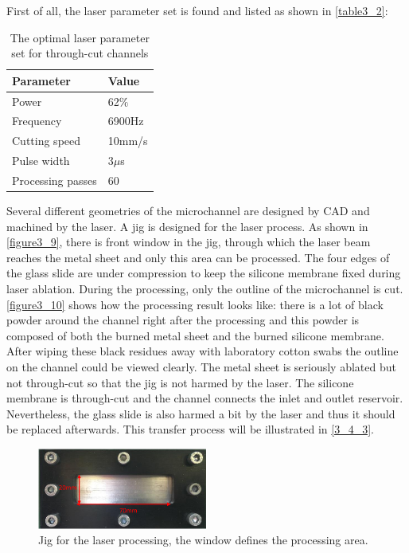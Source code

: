 First of all, the laser parameter set is found and listed as shown in \autoref{table3_2}:

\begin{table}[!h]
    \centering
    \caption{The optimal laser parameter set for through-cut channels}
    \begin{tabular}{ll}
    \toprule
    Parameter  &   Value \\
    \midrule
    Power  &  62$\%$ \\
    Frequency  &  6900Hz \\
    Cutting speed  &  10mm/s \\
    Pulse width  &  3$\mu$s \\
    Processing passes  &  60\\
    \bottomrule
    \end{tabular}
    \label{table3_2}
\end{table}

Several different geometries of the microchannel are designed by CAD and machined by the laser. A jig is designed for the laser process. As shown in \autoref{figure3_9}, there is front window in the jig, through which the laser beam reaches the metal sheet and only this area can be processed. The four edges of the glass slide are under compression to keep the silicone membrane fixed during laser ablation. During the processing, only the outline of the microchannel is cut. \autoref{figure3_10} shows how the processing result looks like: there is a lot of black powder around the channel right after the processing and this powder is composed of both the burned metal sheet and the burned silicone membrane. After wiping these black residues away with laboratory cotton swabs the outline on the channel could be viewed clearly. The metal sheet is seriously ablated but not through-cut so that the jig is not harmed by the laser. The silicone membrane is through-cut and the channel connects the inlet and outlet reservoir. Nevertheless, the glass slide is also harmed a bit by the laser and thus it should be replaced afterwards. This transfer process will be illustrated in \autoref{3_4_3}.

\begin{figure}[ht]%
\centering
\includegraphics[width=0.5\textwidth]{figures/designandfabrication/figure3_9}%
\caption{Jig for the laser processing, the window defines the processing area.}%
\label{figure3_9}%
\end{figure}

